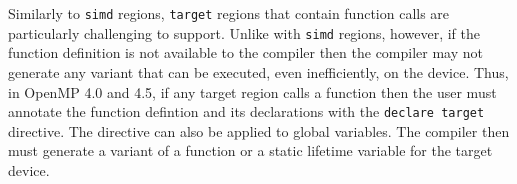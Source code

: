Similarly to \texttt{simd} regions, \texttt{target} regions that contain 
function calls are particularly challenging to support.  Unlike with 
\texttt{simd} regions, however, if the function definition is not 
available to the compiler then the compiler may not generate any variant
that can be executed, even inefficiently, on the device. Thus, in OpenMP 4.0
and 4.5, if any target region calls a function then the user must annotate  
the function defintion and its declarations with the \texttt{declare target} 
directive. The directive can also be applied to global variables. The compiler
then must generate a variant of a function or a static lifetime variable for 
the target device. 



